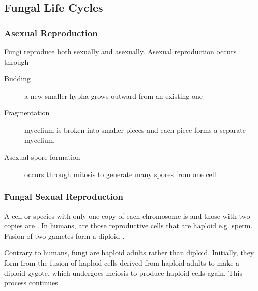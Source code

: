 \documentclass[../Bio_chemistryReview.tex]{subfiles}
\begin{document}
\subsection{Fungal Life Cycles}
\subsubsection{Asexual Reproduction}
Fungi reproduce both sexually and asexually. Asexual reproduction occurs through
\begin{description}
    \item[Budding] a new smaller hypha grows outward from an existing one
    \item[Fragmentation] mycelium is broken into smaller pieces and each piece
        forms a separate mycelium
    \item[Asexual spore formation] occurs through mitosis to generate many
        spores from one cell
\end{description}

\subsubsection{Fungal Sexual Reproduction}
A cell or species with only one copy of each chromosome is  and
those with two copies are . In humans,  are
those reproductive cells that are haploid e.g. sperm. Fusion of two gametes form
a diploid .\par

Contrary to humans, fungi are haploid adults rather than diploid. Initially,
they form from the fusion of haploid cells derived from haploid adults to make
a diploid zygote, which undergoes meiosis to produce haploid cells again. This
process continues.
\end{document}
